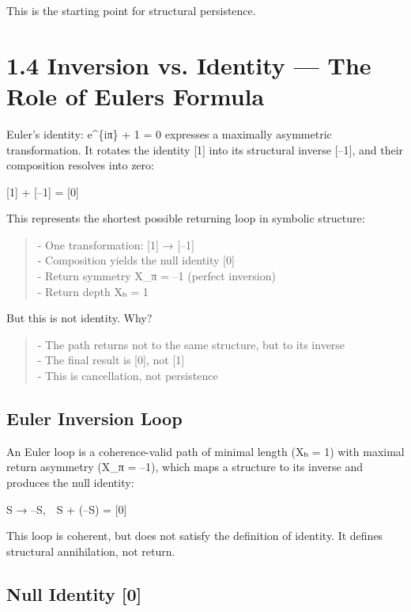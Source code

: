 This is the starting point for structural persistence.

\section{1.4 \textbar{} Inversion vs. Identity --- The Role of
Euler\textquotesingle s
Formula}\label{inversion-vs.-identity-the-role-of-eulers-formula}

Euler's identity: e\^{}\{iπ\} + 1 = 0 expresses a maximally asymmetric
transformation. It rotates the identity {[}1{]} into its structural
inverse {[}--1{]}, and their composition resolves into zero:

{[}1{]} + {[}--1{]} = {[}0{]}

This represents the shortest possible returning loop in symbolic
structure:

\begin{quote}
- One transformation: {[}1{]} → {[}--1{]}\\
- Composition yields the null identity {[}0{]}\\
- Return symmetry X\_π = --1 (perfect inversion)\\
- Return depth Xₕ = 1
\end{quote}

But this is not identity. Why?

\begin{quote}
- The path returns not to the same structure, but to its inverse\\
- The final result is {[}0{]}, not {[}1{]}\\
- This is cancellation, not persistence
\end{quote}

\subsection{Euler Inversion Loop}\label{euler-inversion-loop}

An Euler loop is a coherence-valid path of minimal length (Xₕ = 1) with
maximal return asymmetry (X\_π = --1), which maps a structure to its
inverse and produces the null identity:

S → --S, S + (--S) = {[}0{]}

This loop is coherent, but does not satisfy the definition of identity.
It defines structural annihilation, not return.

\subsection{Null Identity {[}0{]}}\label{null-identity-0}


